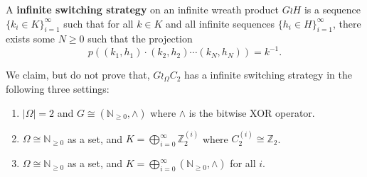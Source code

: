 \begin{definition}
  A \textbf{infinite switching strategy} on an infinite wreath product $G \wr H$
  is a sequence $\{k_i \in K\}_{i=1}^\infty$ such that for all $k \in K$ and
  all infinite sequences ${\{h_i \in H\}_{i=1}^\infty}$,
  there exists some $N \geq 0$ such that the projection \begin{equation}
    p((k_1, h_1)\cdot(k_2, h_2)\cdots(k_N, h_N)) = k^{-1}.
  \end{equation}
\end{definition}

We claim, but do not prove that, $G \wr_\Omega C_2$ has a infinite switching
strategy in the following three settings: \begin{enumerate}
  \item $|\Omega| = 2$ and $G \cong (\mathbb N_{\geq 0}, \wedge)$ where $\wedge$ is the bitwise XOR operator.
  \item $\Omega \cong \mathbb N_{\geq 0}$ as a set, and $K = \bigoplus_{i=0}^\infty \mathbb Z_2^{(i)}$ where $C_2^{(i)} \cong \mathbb Z_2$.
  \item $\Omega \cong \mathbb N_{\geq 0}$ as a set, and $K = \bigoplus_{i=0}^\infty (\mathbb N_{\geq 0}, \wedge)$ for all $i$.
\end{enumerate}



